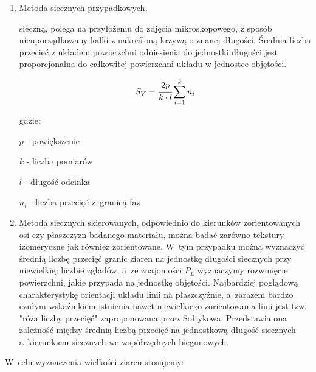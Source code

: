 \documentclass[a4paper,12pt]{article}
\begin{document}
\begin{enumerate}
    \item  Metoda siecznych przypadkowych, {\color{blue} sieczną, polega na przyłożeniu do zdjęcia mikroskopowego, z sposób nieuporządkowany kalki z nakreśloną krzywą o znanej długości. Średnia liczba przecięć z układem powierzchni odniesienia do jednostki długości jest proporcjonalna do całkowitej powierzchni układu w jednostce objętości. 
    
$$S_V=\cfrac{2p}{k\cdot l} \sum ^k_{i=1}n_i$$

gdzie:

$p$ - powiększenie

$k$ - liczba pomiarów

$l$ - długość odcinka

$n_i$ - liczba przecięć z~granicą faz
    } 
    \item  Metoda siecznych skierowanych, odpowiednio do kierunków zorientowanych osi czy płaszczyzn badanego materiału, można badać zarówno tekstury izomeryczne jak również zorientowane. W~tym przypadku można wyznaczyć średnią liczbę przecięć granic ziaren na jednostkę długości siecznych przy niewielkiej liczbie zgładów, a~ze znajomości $P_L$ wyznaczymy rozwinięcie powierzchni, jakie przypada na jednostkę objętości. Najbardziej poglądową charakterystykę orientacji układu linii na płaszczyźnie, a~zarazem bardzo czułym wskaźnikiem istnienia nawet niewielkiego zorientowania linii jest tzw. "róża liczby przecięć" zaproponowana przez Sołtykowa. Przedstawia ona zależność między średnią liczbą przecięć na jednostkową długość siecznych a~kierunkiem siecznych we współrzędnych biegunowych.
\end{enumerate}

W~celu wyznaczenia wielkości ziaren  stosujemy:
\end{document}
